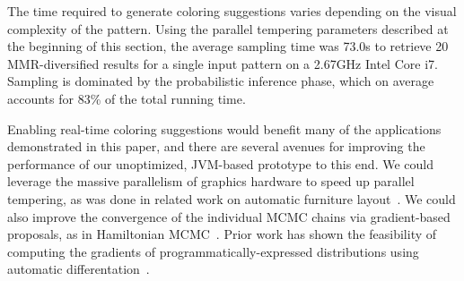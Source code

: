 The time required to generate coloring suggestions varies depending on the visual complexity of the pattern. Using the parallel tempering parameters described at the beginning of this section, the average sampling time was 73.0s to retrieve 20 MMR-diversified results for a single input pattern on a 2.67GHz Intel Core i7. Sampling is dominated by the probabilistic inference phase, which on average accounts for 83\% of the total running time.

Enabling real-time coloring suggestions would benefit many of the applications demonstrated in this paper, and there are several avenues for improving the performance of our unoptimized, JVM-based prototype to this end. We could leverage the massive parallelism of graphics hardware to speed up parallel tempering, as was done in related work on automatic furniture layout~\cite{MerrellFurnitureLayout}. We could also improve the convergence of the individual MCMC chains via gradient-based proposals, as in Hamiltonian MCMC~\cite{HamiltonianMCMC}. Prior work has shown the feasibility of computing the gradients of programmatically-expressed distributions using automatic differentation~\cite{AutoDiff}. 